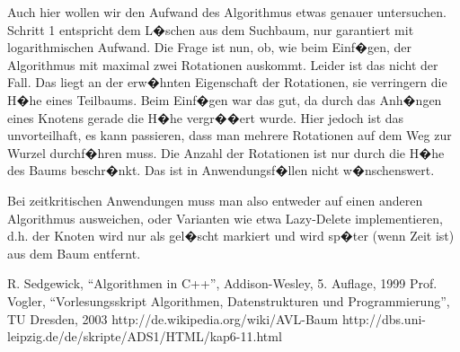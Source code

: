 Auch hier wollen wir den Aufwand des Algorithmus etwas genauer untersuchen. Schritt 1 entspricht dem L�schen aus dem Suchbaum, nur garantiert mit logarithmischen Aufwand. Die Frage ist nun, ob, wie beim Einf�gen, der Algorithmus mit maximal zwei Rotationen auskommt. Leider ist das nicht der Fall. Das liegt an der erw�hnten Eigenschaft der Rotationen, sie verringern die H�he eines Teilbaums. Beim Einf�gen war das gut, da durch das Anh�ngen eines Knotens gerade die H�he vergr��ert wurde. Hier jedoch ist das unvorteilhaft, es kann passieren, dass man mehrere Rotationen auf dem Weg zur Wurzel durchf�hren muss. Die Anzahl der Rotationen ist nur durch die H�he des Baums beschr�nkt. Das ist in Anwendungsf�llen nicht w�nschenswert.

Bei zeitkritischen Anwendungen muss man also entweder auf einen anderen Algorithmus ausweichen, oder Varianten wie etwa Lazy-Delete implementieren, d.h. der Knoten wird nur als gel�scht markiert und wird sp�ter (wenn Zeit ist) aus dem Baum entfernt.

\begin{thebibliography}{99}
     R. Sedgewick, "`Algorithmen in C++"', Addison-Wesley, 5. Auflage, 1999
     Prof. Vogler, "`Vorlesungsskript Algorithmen, Datenstrukturen und Programmierung"', TU Dresden, 2003
     http://de.wikipedia.org/wiki/AVL-Baum
     http://dbs.uni-leipzig.de/de/skripte/ADS1/HTML/kap6-11.html
\end{thebibliography}